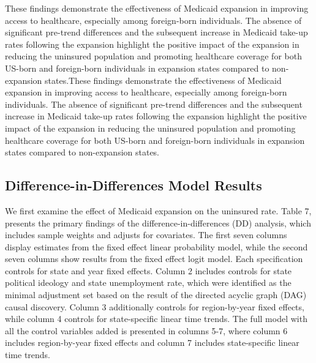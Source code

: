 \documentclass[
]{article}
\begin{document}
These findings demonstrate the effectiveness of Medicaid expansion in
improving access to healthcare, especially among foreign-born
individuals. The absence of significant pre-trend differences and the
subsequent increase in Medicaid take-up rates following the expansion
highlight the positive impact of the expansion in reducing the uninsured
population and promoting healthcare coverage for both US-born and
foreign-born individuals in expansion states compared to non-expansion
states.These findings demonstrate the effectiveness of Medicaid
expansion in improving access to healthcare, especially among
foreign-born individuals. The absence of significant pre-trend
differences and the subsequent increase in Medicaid take-up rates
following the expansion highlight the positive impact of the expansion
in reducing the uninsured population and promoting healthcare coverage
for both US-born and foreign-born individuals in expansion states
compared to non-expansion states.

\hypertarget{difference-in-differences-model-results}{%
\subsection{Difference-in-Differences Model
Results}\label{difference-in-differences-model-results}}

We first examine the effect of Medicaid expansion on the uninsured rate.
Table 7, presents the primary findings of the difference-in-differences
(DD) analysis, which includes sample weights and adjusts for covariates.
The first seven columns display estimates from the fixed effect linear
probability model, while the second seven columns show results from the
fixed effect logit model. Each specification controls for state and year
fixed effects. Column 2 includes controls for state political ideology
and state unemployment rate, which were identified as the minimal
adjustment set based on the result of the directed acyclic graph (DAG)
causal discovery. Column 3 additionally controls for region-by-year
fixed effects, while column 4 controls for state-specific linear time
trends. The full model with all the control variables added is presented
in columns 5-7, where column 6 includes region-by-year fixed effects and
column 7 includes state-specific linear time trends.
\end{document}
